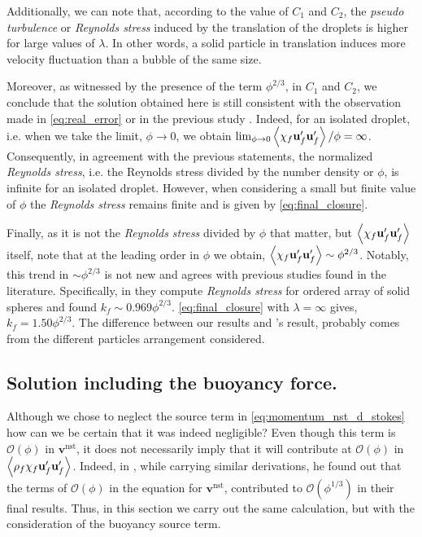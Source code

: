 Additionally, we can note that, according to the value of $C_1$ and $C_2$, the \textit{pseudo turbulence} or \textit{Reynolds stress} induced by the translation of the droplets is higher for large values of $\lambda$. 
In other words, a solid particle in translation induces more velocity fluctuation than a bubble of the same size. 

Moreover, as witnessed by the presence of the term $\phi^{2/3}$, in $C_1$ and $C_2$, we conclude that the solution obtained here is still consistent with the observation made in \ref{eq:real_error} or in the previous study \citep{caflisch1985variance}. 
Indeed, for an isolated droplet, i.e. when we take the limit, $\phi \to 0$, we obtain $\lim_{\phi \to 0} \left<\chi_f \textbf{u}_f' \textbf{u}_f'\right> / \phi = \infty$. 
Consequently, in agreement with the previous statements, the normalized \textit{Reynolds stress}, i.e. the Reynolds stress divided by the number density or $\phi$,  is infinite for an isolated droplet.
However, when considering a small but finite value of $\phi$ the \textit{Reynolds stress} remains finite and is given by \ref{eq:final_closure}. 

Finally, as it is not the \textit{Reynolds stress} divided by $\phi$ that matter, but $\left<\chi_f\textbf{u}_f'\textbf{u}_f'\right>$ itself, note that at the leading order in $\phi$ we obtain,  $\left<\chi_f\textbf{u}_f'\textbf{u}_f'\right>\sim\phi^{2/3}$. 
Notably, this trend in $\sim\phi^{2/3}$ is not new and agrees with previous studies found in the literature.
Specifically, in \citet{hill2001first} they compute \textit{Reynolds stress} for ordered array of solid spheres and found $k_f \sim 0.969 \phi^{2/3}$. 
\ref{eq:final_closure} with $\lambda =\infty$ gives, $k_f  = 1.50 \phi^{2/3}$.
The difference between our results and \citet{hill2001first}'s result, probably comes from the different particles arrangement considered.  



\subsection{Solution including the buoyancy force. }

Although we chose to neglect the source term in \ref{eq:momentum_nst_d_stokes} how can we be certain that it was indeed negligible? 
Even though this term is $\mathcal{O}(\phi)$ in $\textbf{v}^\text{nst}$, it does not necessarily imply that it will contribute at $\mathcal{O}(\phi)$ in $\left<\rho_f\chi_f \textbf{u}_f'\textbf{u}_f'\right>$. 
Indeed, in \citet{zhang2021ensemble}, while carrying similar derivations, he found out that the terms of $\mathcal{O}(\phi)$ in the equation for $\textbf{v}^\text{nst}$, contributed to $\mathcal{O}(\phi^{1/3})$ in their final results.  
Thus, in this section we carry out the same calculation, but with the consideration of the buoyancy source term. 


